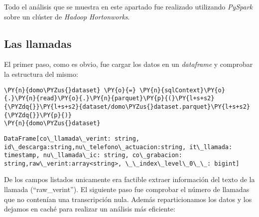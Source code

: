 Todo el análisis que se muestra en este apartado fue realizado utilizando \textit{PySpark} sobre un clúster de \textit{Hadoop} \textit{Hortonworks}.

\subsection{Las llamadas}



El primer paso, como es obvio, fue cargar los datos en un \textit{dataframe} y comprobar la estructura del mismo: 


\vspace{0.5cm}

\begin{tcolorbox}[breakable, size=fbox, boxrule=1pt, pad at break*=1mm,colback=cellbackground, colframe=cellborder]
\begin{Verbatim}[commandchars=\\\{\}]
\PY{n}{domo\PYZus{}dataset} \PY{o}{=} \PY{n}{sqlContext}\PY{o}{.}\PY{n}{read}\PY{o}{.}\PY{n}{parquet}\PY{p}{(}\PY{l+s+s2}{\PYZdq{}}\PY{l+s+s2}{dataset/domo\PYZus{}dataset.parquet}\PY{l+s+s2}{\PYZdq{}}\PY{p}{)}
\PY{n}{domo\PYZus{}dataset}
\end{Verbatim}
\end{tcolorbox}

 \begin{tcolorbox}[breakable, size=fbox, boxrule=.5pt, pad at break*=1mm, opacityfill=0]
\begin{Verbatim}[commandchars=\\\{\}]
DataFrame[co\_llamada\_verint: string, id\_descarga:string,nu\_telefono\_actuacion:string, it\_llamada: timestamp, nu\_llamada\_ic: string, co\_grabacion: string,raw\_verint:array<string>, \_\_index\_level\_0\_\_: bigint]
\end{Verbatim}
\end{tcolorbox}


De los campos listados unicamente era factible extraer información del texto de la llamada (``raw\_verint''). El siguiente paso fue comprobar el número de llamadas que no contenían una transcripción nula. Además reparticionamos los datos y los dejamos en caché para realizar un análisis más eficiente: 

\vspace{0.5cm}


